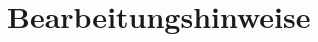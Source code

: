 \documentclass[
  name=\assignment,
  start=\releasedate,
  end=\duedate,
  subject=\lecture\,--\,\semester,
  group=\group,
  url=\url,
  author=\authors
]{assignment}
\begin{document}
\section*{Bearbeitungshinweise}








%


\end{document}
